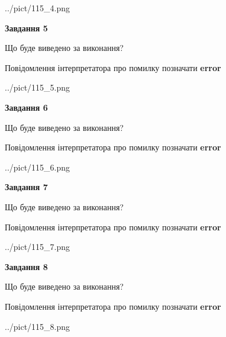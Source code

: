 \documentclass[12pt, ukrainian]{article}
\begin{document}
{\begin{center}
	{../pict/115_4.png}
\end{center}
\newpage

{\begin {center}\textbf{Завдання 5}\end {center}}\par
Що буде виведено за виконання? \par
Повідомлення інтерпретатора про помилку позначати \textbf{error}

\begin{center}
	{../pict/115_5.png}
\end{center}
\newpage

{\begin {center}\textbf{Завдання 6}\end {center}}\par
Що буде виведено за виконання? \par
Повідомлення інтерпретатора про помилку позначати \textbf{error}

\begin{center}
	{../pict/115_6.png}
\end{center}
\newpage

{\begin {center}\textbf{Завдання 7}\end {center}}\par
Що буде виведено за виконання? \par
Повідомлення інтерпретатора про помилку позначати \textbf{error}

\begin{center}
	{../pict/115_7.png}
\end{center}
\newpage

{\begin {center}\textbf{Завдання 8}\end {center}}\par
Що буде виведено за виконання? \par
Повідомлення інтерпретатора про помилку позначати \textbf{error}

\begin{center}
	{../pict/115_8.png}
\end{center}
\newpage

}
\end{document}
